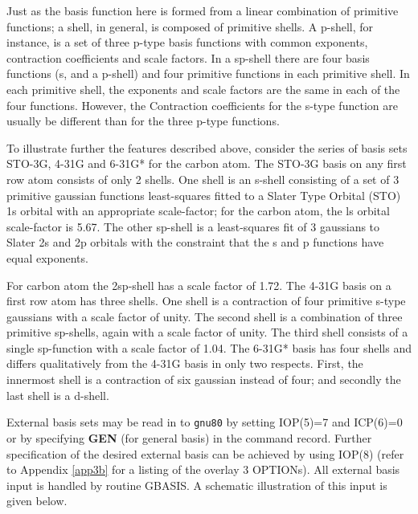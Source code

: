 Just as the basis function here is formed from a linear combination
of primitive functions; a shell, in general, is composed of primitive
shells.  A p-shell, for instance, is a set of three p-type basis
functions with common exponents, contraction coefficients
and scale factors.  In a sp-shell there are four basis functions (s,
and a p-shell) and four primitive functions in each primitive shell.
In each primitive shell, the exponents and scale factors are the same
in each of the four functions.  However, the Contraction coefficients
for the s-type function are usually be different than for the three p-type
functions.

To illustrate further the features described above, consider the series
of basis sets STO-3G, 4-31G and 6-31G* for the carbon atom.  The
STO-3G basis on any first row atom consists of only 2 shells.  One
shell is an s-shell consisting of a set of 3 primitive gaussian
functions least-squares fitted to a Slater Type Orbital (STO)
1s orbital with an
appropriate scale-factor; for the carbon atom, the ls orbital scale-factor
is 5.67.  The other sp-shell is a least-squares fit of 3 gaussians to
Slater 2s and 2p orbitals with the constraint that the s and p functions
have equal exponents.

For carbon atom the 2sp-shell has a scale factor of 1.72.  The 4-31G
basis on a first row atom has three shells.  One shell is a contraction of
four primitive s-type gaussians with a scale factor of unity.  The second
shell is a combination of three primitive sp-shells, again with a scale
factor of unity.  The third shell consists of a single sp-function with a
scale factor of 1.04.  The 6-31G* basis has four shells and differs
qualitatively from the 4-31G basis in only two respects.  First, the
innermost shell is a contraction of six gaussian instead of four; and
secondly the last shell is a d-shell.
 
External basis sets may be read in to {\tt gnu80} by setting IOP(5)=7
and ICP(6)=0 or by specifying {\bf GEN} (for general basis) in the 
command record.
Further specification of the desired external basis
can be achieved by using IOP(8) (refer to Appendix \ref{app3b} 
for a listing of
the overlay 3 OPTIONs).  All external basis input is handled by routine
GBASIS.  A schematic illustration of this input is given below.

